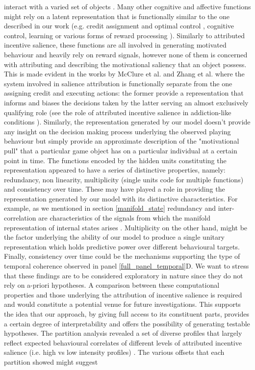 interact with a varied set of objects \cite{simpson2016behavioral,toates1994comparing,berridge2004motivation,zhang2009neural}. Many other cognitive and affective functions might rely on a latent representation that is functionally similar to the one described in our work (e.g. credit assignment and optimal control \cite{wang2018prefrontal, barto2004reinforcement}, cognitive control, learning \cite{skinner1965science} or various forms of reward processing \cite{schultz1997neural, schultz2000reward}). Similarly to attributed incentive salience, these functions are all involved in generating motivated behaviour and heavily rely on reward signals, however none of them is concerned with attributing and describing the motivational saliency that an object possess. This is made evident in the works by McClure et al. \cite{mcclure2003computational} and Zhang et al. \cite{zhang2009neural} where the system involved in salience attribution is functionally separate from the one assigning credit and executing actions: the former provide a representation that informs and biases the decisions taken by the latter serving an almost exclusively qualifying role (see the role of attributed incentive salience in addiction-like conditions \cite{robinson1993neural}). Similarly, the representation generated by our model doesn't provide any insight on the decision making process underlying the observed playing behaviour but simply provide an approximate description of the "motivational pull" that a particular game object has on a particular individual at a certain point in time. The functions encoded by the hidden units constituting the representation appeared to have a series of distinctive properties, namely: redundancy, non linearity, multiplicity (single units code for multiple functions) and consistency over time. These may have played a role in providing the representation generated by our model with its distinctive characteristics. For example, as we mentioned in section \ref{manifold_state} redundancy and inter-correlation are characteristics of the signals from which the manifold representation of internal states arises \cite{seung2000manifold,gallego2017neural}. Multiplicity on the other hand, might be the factor underlying the ability of our model to produce a single unitary representation which holds predictive power over different behavioural targets. Finally, consistency over time could be the mechanisms supporting the type of temporal coherence observed in panel \ref{full_panel_temporal}D. We want to stress that these findings are to be considered exploratory in nature since they do not rely on a-priori hypotheses. A comparison between these computational properties and those underlying the attribution of incentive salience is required and would constitute a potential venue for future investigations. This supports the idea that our approach, by giving full access to its constituent parts, provides a certain degree of interpretability and offers the possibility of generating testable hypotheses. The partition analysis revealed a set of diverse profiles that largely reflect expected behavioural correlates of different levels of attributed incentive salience (i.e. high vs low intensity profiles) \cite{berridge2004motivation}. The various offsets that each partition showed might suggest 